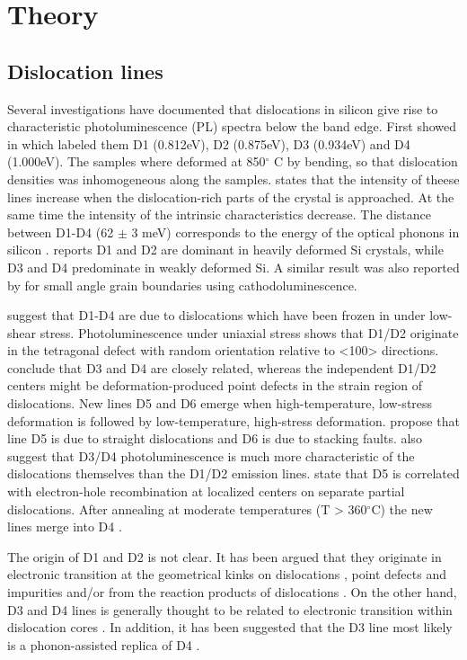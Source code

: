 \clearpage
\section{Theory}

\subsection{Dislocation lines}

Several investigations have documented that dislocations in silicon give rise to characteristic photoluminescence (PL) spectra below the band edge. First showed in \cite{drozdov76} which labeled them D1 (0.812eV), D2 (0.875eV), D3 (0.934eV) and D4 (1.000eV). The samples where deformed at 850$^\circ$ C by bending, so that dislocation densities was inhomogeneous along the samples. \cite{drozdov76} states that the intensity of theese lines increase when the dislocation-rich parts of the crystal is approached. At the same time the intensity of the intrinsic characteristics decrease. The distance between D1-D4 (62 $\pm$ 3 meV) corresponds to the energy of the optical phonons in silicon \cite{drozdov76}. \cite{drozdov76} reports D1 and D2 are dominant in heavily deformed Si crystals, while D3 and D4 predominate in weakly deformed Si. A similar result was also reported by \cite{lee09} for small angle grain boundaries using cathodoluminescence.

\cite{sauer85} suggest that D1-D4 are due to dislocations which have been frozen in under low-shear stress. Photoluminescence under uniaxial stress shows that D1/D2 originate in the tetragonal defect with random orientation relative to <100> directions. \cite{sauer85} conclude that D3 and D4 are closely related, whereas the independent D1/D2 centers might be deformation-produced point defects in the strain region of dislocations. New lines D5 and D6 emerge when high-temperature, low-stress deformation is followed by low-temperature, high-stress deformation. \cite{sauer85} propose that line D5 is due to straight dislocations and D6 is due to stacking faults. \cite{sauer85} also suggest that D3/D4 photoluminescence is much more characteristic of the dislocations themselves than the D1/D2 emission lines. \cite{weronek91} state that D5 is correlated with electron-hole recombination at localized centers on separate partial dislocations. After annealing at moderate temperatures (T > 360$^\circ$C) the new lines merge into D4 \cite{weronek91}.


The origin of D1 and D2 is not clear. It has been argued that they originate in electronic transition at the geometrical kinks on dislocations \cite{suezawa83}, point defects \cite{sauer85} and impurities \cite{higgs91} and/or from the reaction products of dislocations \cite{sekiguchi95}. On the other hand, D3 and D4 lines is generally thought to be related to electronic transition within dislocation cores \cite{kveder95}. In addition, it has been suggested that the D3 line most likely is a phonon-assisted replica of D4 \cite{kveder95}.


